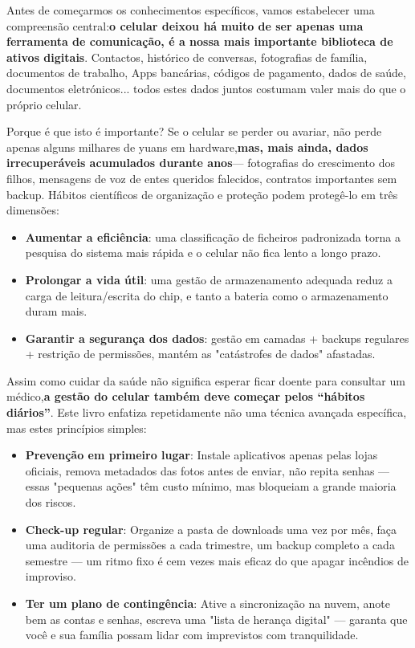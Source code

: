 Antes de começarmos os conhecimentos específicos, vamos estabelecer uma compreensão central:\textbf{o celular deixou há muito de ser apenas uma ferramenta de comunicação, é a nossa mais importante biblioteca de ativos digitais}. Contactos, histórico de conversas, fotografias de família, documentos de trabalho, Apps bancárias, códigos de pagamento, dados de saúde, documentos eletrónicos... todos estes dados juntos costumam valer mais do que o próprio celular.

\begin{tcbinfo}{Porque é que isto é importante?}
Se o celular se perder ou avariar, não perde apenas alguns milhares de yuans em hardware,\textbf{mas, mais ainda, dados irrecuperáveis acumulados durante anos}— fotografias do crescimento dos filhos, mensagens de voz de entes queridos falecidos, contratos importantes sem backup. Hábitos científicos de organização e proteção podem protegê-lo em três dimensões:

\begin{itemize}
  \item \textbf{Aumentar a eficiência}: uma classificação de ficheiros padronizada torna a pesquisa do sistema mais rápida e o celular não fica lento a longo prazo.
  \item \textbf{Prolongar a vida útil}: uma gestão de armazenamento adequada reduz a carga de leitura/escrita do chip, e tanto a bateria como o armazenamento duram mais.
  \item \textbf{Garantir a segurança dos dados}: gestão em camadas + backups regulares + restrição de permissões, mantém as "catástrofes de dados" afastadas.
\end{itemize}

\end{tcbinfo}


Assim como cuidar da saúde não significa esperar ficar doente para consultar um médico,\textbf{a gestão do celular também deve começar pelos “hábitos diários”}. Este livro enfatiza repetidamente não uma técnica avançada específica, mas estes princípios simples:

\begin{itemize}
  \item \textbf{Prevenção em primeiro lugar}: Instale aplicativos apenas pelas lojas oficiais, remova metadados das fotos antes de enviar, não repita senhas — essas "pequenas ações" têm custo mínimo, mas bloqueiam a grande maioria dos riscos.
  \item \textbf{Check-up regular}: Organize a pasta de downloads uma vez por mês, faça uma auditoria de permissões a cada trimestre, um backup completo a cada semestre — um ritmo fixo é cem vezes mais eficaz do que apagar incêndios de improviso.
  \item \textbf{Ter um plano de contingência}: Ative a sincronização na nuvem, anote bem as contas e senhas, escreva uma "lista de herança digital" — garanta que você e sua família possam lidar com imprevistos com tranquilidade.
\end{itemize}
